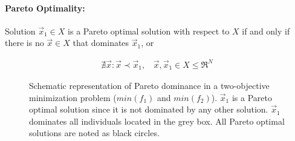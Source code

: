 \paragraph{Pareto Optimality:} Solution  $\vec{x}_1 \in X$ is a Pareto optimal solution with respect to $X$ if and only if there is no $\vec{x} \in X$ that dominates $\vec{x}_1$, or 


\begin{eqnarray}
    \nexists\vec{x}:\vec{x}\prec\vec{x}_1, ~~~~ \vec{x},\vec{x}_1\in X \!\leq\! \Re^{N}
\end{eqnarray}
 

\begin{figure}[h!]
\begin{minipage}[b]{1\linewidth}
 \centering
\end{minipage}
\caption{Schematic representation of Pareto dominance in a two-objective minimization problem ($min(f_1)$ and $min(f_2)$). $\vec{x}_1$ is a Pareto optimal solution since it is not dominated by any other solution. $\vec{x}_1$ dominates all individuals located in the grey box. All Pareto optimal solutions are noted as black circles.} 
\label{Pareto2}
\end{figure}


